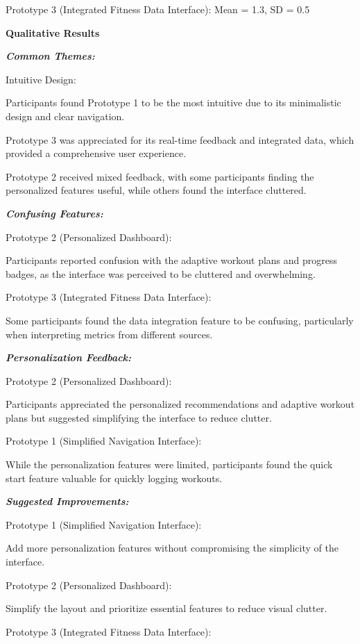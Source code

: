 \documentclass[
	letterpaper, %
]{jdf}
\begin{document}
Prototype 3 (Integrated Fitness Data Interface): Mean = 1.3, SD = 0.5

\textbf{Qualitative Results}

\textbf{\textit{Common Themes:
}}
 

Intuitive Design:

Participants found Prototype 1 to be the most intuitive due to its minimalistic design and clear navigation.

Prototype 3 was appreciated for its real-time feedback and integrated data, which provided a comprehensive user experience.

Prototype 2 received mixed feedback, with some participants finding the personalized features useful, while others found the interface cluttered.

\textbf{\textit{Confusing Features:
}}
 

Prototype 2 (Personalized Dashboard):

Participants reported confusion with the adaptive workout plans and progress badges, as the interface was perceived to be cluttered and overwhelming.

Prototype 3 (Integrated Fitness Data Interface):

Some participants found the data integration feature to be confusing, particularly when interpreting metrics from different sources.

\textbf{\textit{Personalization Feedback:
}}
 

Prototype 2 (Personalized Dashboard):

Participants appreciated the personalized recommendations and adaptive workout plans but suggested simplifying the interface to reduce clutter.

Prototype 1 (Simplified Navigation Interface):

While the personalization features were limited, participants found the quick start feature valuable for quickly logging workouts.

\textbf{\textit{Suggested Improvements:
}}
 

Prototype 1 (Simplified Navigation Interface):

Add more personalization features without compromising the simplicity of the interface.

Prototype 2 (Personalized Dashboard):

Simplify the layout and prioritize essential features to reduce visual clutter.

Prototype 3 (Integrated Fitness Data Interface):
\end{document}

